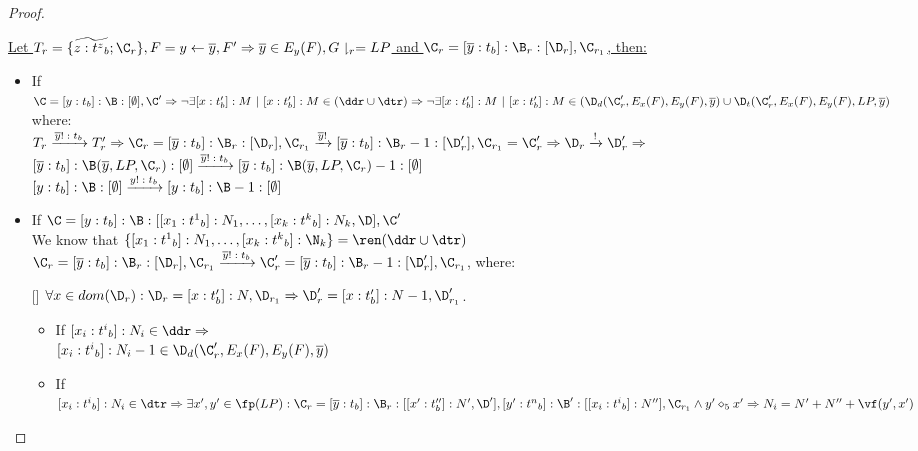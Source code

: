 \begin{proof}
\begin{itemize}
\end{itemize}


\underline{Let $T_r=\{\widetilde{z:{t^z}_b};\C_r\}, F=y\leftarrow \overline{y},F'\Rightarrow \overline{y}\in E_y(F), G\downharpoonright_r=LP$ and $\C_r=[\overline{y}:t_b]:\B_r:[\D_r],\C_{r_1}$, then:}

\begin{itemize}

\item If $\C=[y:t_b]:\B:[\emptyset],\C'\Rightarrow \neg \exists [x:t_b']:M\ |\ [x:t_b']:M\in (\ddr \cup \dtr)\Rightarrow \neg \exists [x:t_b']:M\ |\ [x:t_b']:M\in (\D_d(\C_r',E_x(F),E_y(F),\overline{y}) \cup \D_t(\C_r',E_x(F),E_y(F),LP,\overline{y})$ where:\\

 $T_r\xrightarrow{\text{$\overline{y}!:t_b$}} T_r'\Rightarrow \C_r=[\overline{y}:t_b]:\B_r:[\D_r],\C_{r_1}\xrightarrow{\text{$\overline{y}!$}} [\overline{y}:t_b]:\B_r-1:[\D_r'],\C_{r_1}=\C_r'\Rightarrow \D_r\xrightarrow{\text{!}} \D_r'\Rightarrow$\\

$[\overline{y}:t_b]:\B(\overline{y},LP,\C_r):[\emptyset]\xrightarrow{\text{$\overline{y}!:t_b$}}[\overline{y}:t_b]:\B(\overline{y},LP,\C_r)-1:[\emptyset]$\\

$[y:t_b]:\B:[\emptyset]\xrightarrow{\text{$y!:t_b$}}[y:t_b]:\B-1:[\emptyset]$



\item If $\C=[y:t_b]:\B:[[x_1:{t^1}_b]:N_1, \dots, [x_k:{t^k}_b]:N_k,\D],\C'$ \\

We know that $\{[x_1:{t^1}_b]:N_1, \dots, [x_k:{t^k}_b]:\N_k\}=\ren(\ddr \cup \dtr)$\\


$\C_r=[\overline{y}:t_b]:\B_r:[\D_r],\C_{r_1}\xrightarrow{\text{$\overline{y}!:t_b$}}\C_r'=[\overline{y}:t_b]:\B_r-1:[\D_r'],\C_{r_1}$, where:

[] $\forall x\in dom(\D_r): \D_r=[x:t_b']:N, \D_{r_1}\Rightarrow \D_r'=[x:t_b']:N-1, \D_{r_1}'$.


\begin{itemize}
\item If $[x_i:{t^i}_b]:N_i \in \ddr \Rightarrow$ \\
$[x_i:{t^i}_b]:N_i-1 \in \D_d(\C_r',E_x(F),E_y(F),\overline{y})$ \\

\item If $[x_i:{t^i}_b]:N_i \in \dtr \Rightarrow \exists x',y'\in \fp(LP): \C_r=[\overline{y}:t_b]:\B_r:[[x':t_b'']:N',\D'],[y':{t^n}_b]:\B':[[x_i:{t^i}_b]:N''],\C_{r_1} \wedge y'\diamond_5 x'\Rightarrow N_i=N'+N''+\vf(y',x')$


\end{itemize}
\end{itemize}
\end{proof}
